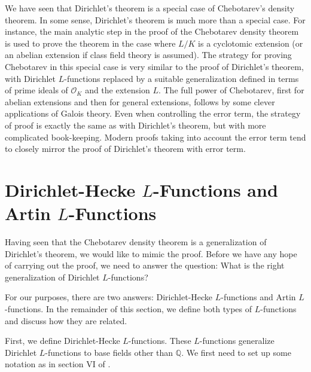 \documentclass[12pt]{amsart}
\theoremstyle{definition}
\theoremstyle{remark}
\numberwithin{equation}{section}
\newcommand{\cO}{\mathcal O}
\newcommand{\bbQ}{\mathbb Q}
\begin{document}
We have seen that Dirichlet's theorem is a special case of Chebotarev's density theorem. In some sense, Dirichlet's theorem is much more than a special case. For instance, the main analytic step in the proof of the Chebotarev density theorem is used to prove the theorem in the case where $L/K$ is a cyclotomic extension (or an abelian extension if class field theory is assumed).  The strategy for proving Chebotarev in this special case is very similar to the proof of Dirichlet's theorem, with Dirichlet $L$-functions replaced by a suitable generalization defined in terms of prime ideals of $\cO_K$ and the extension $L$. The full power of Chebotarev, first for abelian extensions and then for general extensions, follows by some clever applications of Galois theory. Even when controlling the error term, the strategy of proof is exactly the same as with Dirichlet's theorem, but with more complicated book-keeping. Modern proofs taking into account the error term tend to closely mirror the proof of Dirichlet's theorem with error term.


\section{Dirichlet-Hecke $L$-Functions and Artin $L$-Functions}\label{sec:LFunctions}

Having seen that the Chebotarev density theorem is a generalization of Dirichlet's theorem, we would like to mimic the proof. Before we have any hope of carrying out the proof, we need to answer the question: What is the right generalization of Dirichlet $L$-functions?

For our purposes, there are two answers: Dirichlet-Hecke $L$-functions and Artin $L$-functions. In the remainder of this section, we define both types of $L$-functions and discuss how they are related.

First, we define Dirichlet-Hecke $L$-functions. These $L$-functions generalize Dirichlet $L$-functions to base fields other than $\bbQ$. We first need to set up some notation as in section VI of \cite{Lang86}.
\end{document}
